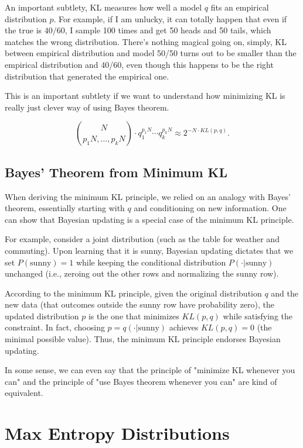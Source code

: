 \documentclass{article}
\begin{document}
An important subtlety, KL measures how well a model $q$ fits an empirical distribution $p$. For example, if I am unlucky, it can totally happen that even if the true is $40/60$, I sample 100 times and get 50 heads and 50 tails, which matches the wrong distribution. There's nothing magical going on, simply, KL between empirical distribution and model 50/50 turns out to be smaller than the empirical distribution and 40/60, even though this happens to be the right distribution that generated the empirical one. 

This is an important subtlety if we want to understand how minimizing KL is really just clever way of using Bayes theorem. 

\[
{N \choose p_1N, \dots, p_kN}\cdot q_1^{p_1N}\cdots q_k^{p_kN}\approx 2^{-N\cdot KL(p,q)}.
\]


\subsection{Bayes' Theorem from Minimum KL}

When deriving the minimum KL principle, we relied on an analogy with Bayes' theorem, essentially starting with \(q\) and conditioning on new information. One can show that Bayesian updating is a special case of the minimum KL principle.

For example, consider a joint distribution (such as the table for weather and commuting). Upon learning that it is sunny, Bayesian updating dictates that we set \(P(\text{sunny})=1\) while keeping the conditional distribution \(P(\cdot|\text{sunny})\) unchanged (i.e., zeroing out the other rows and normalizing the sunny row). 

According to the minimum KL principle, given the original distribution \(q\) and the new data (that outcomes outside the sunny row have probability zero), the updated distribution \(p\) is the one that minimizes \(KL(p,q)\) while satisfying the constraint. In fact, choosing \(p=q(\cdot|\text{sunny})\) achieves \(KL(p,q)=0\) (the minimal possible value). Thus, the minimum KL principle endorses Bayesian updating.

In some sense, we can even say that the principle of "minimize KL whenever you can" and the principle of "use Bayes theorem whenever you can" are kind of equivalent. 

\section{Max Entropy Distributions}
\end{document}
